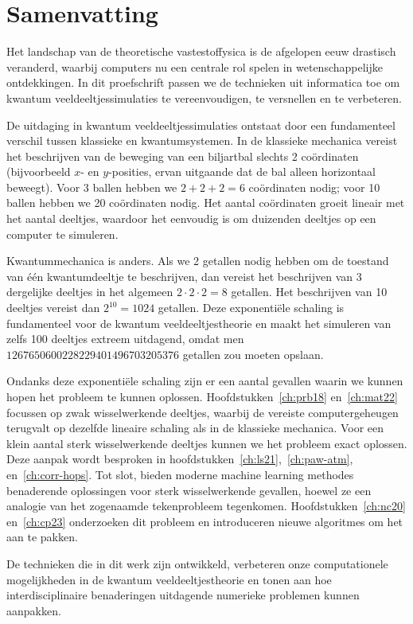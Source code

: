\openright\chapter{Samenvatting}

Het landschap van de theoretische vastestoffysica is de afgelopen eeuw drastisch veranderd, waarbij computers nu een centrale rol spelen in wetenschappelijke ontdekkingen. In dit proefschrift passen we de technieken uit informatica toe om kwantum veeldeeltjessimulaties te vereenvoudigen, te versnellen en te verbeteren.

De uitdaging in kwantum veeldeeltjessimulaties ontstaat door een fundamenteel verschil tussen klassieke en kwantumsystemen. In de klassieke mechanica vereist het beschrijven van de beweging van een biljartbal slechts 2 coördinaten (bijvoorbeeld $x$- en $y$-posities, ervan uitgaande dat de bal alleen horizontaal beweegt). Voor 3 ballen hebben we $2+2+2=6$ coördinaten nodig; voor 10 ballen hebben we 20 coördinaten nodig. Het aantal coördinaten groeit lineair met het aantal deeltjes, waardoor het eenvoudig is om duizenden deeltjes op een computer te simuleren.

Kwantummechanica is anders. Als we 2 getallen nodig hebben om de toestand van één kwantumdeeltje te beschrijven, dan vereist het beschrijven van 3 dergelijke deeltjes in het algemeen $2\cdot 2\cdot 2=8$ getallen. Het beschrijven van 10 deeltjes vereist dan $2^{10}=1024$ getallen. Deze exponentiële schaling is fundamenteel voor de kwantum veeldeeltjestheorie en maakt het simuleren van zelfs 100 deeltjes extreem uitdagend, omdat men $1267650600228229401496703205376$ getallen zou moeten opslaan.

Ondanks deze exponentiële schaling zijn er een aantal gevallen waarin we kunnen hopen het probleem te kunnen oplossen. Hoofdstukken~\ref{ch:prb18} en~\ref{ch:mat22} focussen op zwak wisselwerkende deeltjes, waarbij de vereiste computergeheugen terugvalt op dezelfde lineaire schaling als in de klassieke mechanica. Voor een klein aantal sterk wisselwerkende deeltjes kunnen we het probleem exact oplossen. Deze aanpak wordt besproken in hoofdstukken~\ref{ch:ls21},~\ref{ch:paw-atm}, en~\ref{ch:corr-hops}. Tot slot, bieden moderne machine learning methodes benaderende oplossingen voor sterk wisselwerkende gevallen, hoewel ze een analogie van het zogenaamde tekenprobleem tegenkomen. Hoofdstukken~\ref{ch:nc20} en~\ref{ch:cp23} onderzoeken dit probleem en introduceren nieuwe algoritmes om het aan te pakken.

De technieken die in dit werk zijn ontwikkeld, verbeteren onze computationele mogelijkheden in de kwantum veeldeeltjestheorie en tonen aan hoe interdisciplinaire benaderingen uitdagende numerieke problemen kunnen aanpakken.
